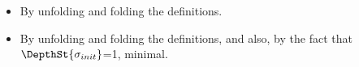 % 
% 
% 
% 
 

\begin{itemize}
\item

 By unfolding and folding the definitions.
\item
By unfolding and folding the definitions, and also, by the fact that $\DepthSt {\sigma_{init}}$=1, \ie minimal.
\end{itemize}

\completeProof

\vspace{1cm}


